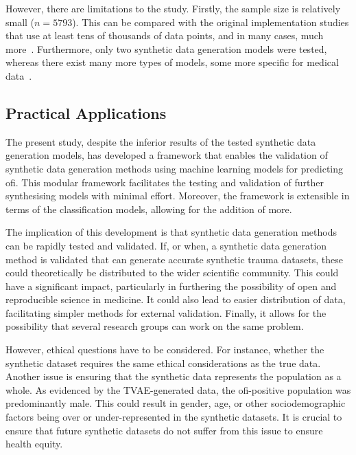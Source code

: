 \documentclass[12pt, a4paper]{article}
\begin{document}
However, there are limitations to the study. Firstly, the sample size is relatively small ($n = 5793$). This can be
compared with the original implementation studies that use at least tens of thousands of data points, and in many
cases, much more~\cite{xu_modeling_2019,karras_training_2020}. Furthermore, only two synthetic data generation models
were tested, whereas there exist many more types of models, some more specific for medical
data~\cite{hernandez_synthetic_2022}.

\subsection{Practical Applications}
The present study, despite the inferior results of the tested synthetic data generation models, has developed a
framework that enables the validation of synthetic data generation methods using machine learning models for predicting
\acrshort{ofi}. This modular framework facilitates the testing and validation of further synthesising models with
minimal effort. Moreover, the framework is extensible in terms of the classification models, allowing for the addition
of more.

The implication of this development is that synthetic data generation methods can be rapidly tested and validated. If,
or when, a synthetic data generation method is validated that can generate accurate synthetic trauma datasets, these
could theoretically be distributed to the wider scientific community. This could have a significant impact,
particularly in furthering the possibility of open and reproducible science in medicine. It could also lead to easier
distribution of data, facilitating simpler methods for external validation. Finally, it allows for the possibility that
several research groups can work on the same problem.

However, ethical questions have to be considered. For instance, whether the synthetic dataset requires the same ethical
considerations as the true data. Another issue is ensuring that the synthetic data represents the population as a
whole. As evidenced by the TVAE-generated data, the \acrshort{ofi}-positive population was predominantly male. This
could result in gender, age, or other sociodemographic factors being over or under-represented in the synthetic
datasets. It is crucial to ensure that future synthetic datasets do not suffer from this issue to ensure health equity.
\end{document}
